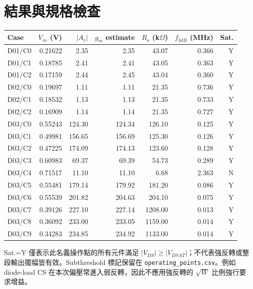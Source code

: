 \section{結果與規格檢查}
\begin{center}\small\begin{tabular}{lrrrrrr}\toprule
Case & $V_{in}$ (V) & $|A_v|$ & $g_m$ estimate & $R_o$ (k$\Omega$) & $f_{3dB}$ (MHz) & Sat. \\ \midrule
D01/C0 & 0.21622 & 2.35 & 2.35 & 43.07 & 0.366 & Y \\
D01/C1 & 0.18785 & 2.41 & 2.41 & 43.05 & 0.363 & Y \\
D01/C2 & 0.17159 & 2.44 & 2.45 & 43.04 & 0.360 & Y \\
D02/C0 & 0.19697 & 1.11 & 1.11 & 21.35 & 0.736 & Y \\
D02/C1 & 0.18532 & 1.13 & 1.13 & 21.35 & 0.733 & Y \\
D02/C2 & 0.16909 & 1.14 & 1.14 & 21.35 & 0.727 & Y \\
D03/C0 & 0.55243 & 124.30 & 124.34 & 126.10 & 0.125 & Y \\
D03/C1 & 0.49981 & 156.65 & 156.69 & 125.30 & 0.126 & Y \\
D03/C2 & 0.47225 & 174.09 & 174.13 & 123.60 & 0.128 & Y \\
D03/C3 & 0.60983 & 69.37 & 69.39 & 54.73 & 0.289 & Y \\
D03/C4 & 0.71517 & 11.10 & 11.10 & 6.68 & 2.363 & N \\
D03/C5 & 0.55481 & 179.14 & 179.92 & 181.20 & 0.086 & Y \\
D03/C6 & 0.55539 & 201.82 & 204.63 & 204.10 & 0.075 & Y \\
D03/C7 & 0.39126 & 227.10 & 227.14 & 1208.00 & 0.013 & Y \\
D03/C8 & 0.36092 & 233.00 & 233.05 & 1159.00 & 0.014 & Y \\
D03/C9 & 0.34283 & 234.85 & 234.92 & 1133.00 & 0.014 & Y \\
\bottomrule\end{tabular}\end{center}
Sat.=Y 僅表示此名義操作點的所有元件滿足 $|V_{DS}|\ge|V_{DSAT}|$；不代表強反轉或整段輸出擺幅皆有效。Subthreshold 標記保留在 \texttt{operating\_points.csv}。例如 diode-load CS 在本次偏壓常進入弱反轉，因此不應用強反轉的 $\sqrt{W}$ 比例強行要求增益。

